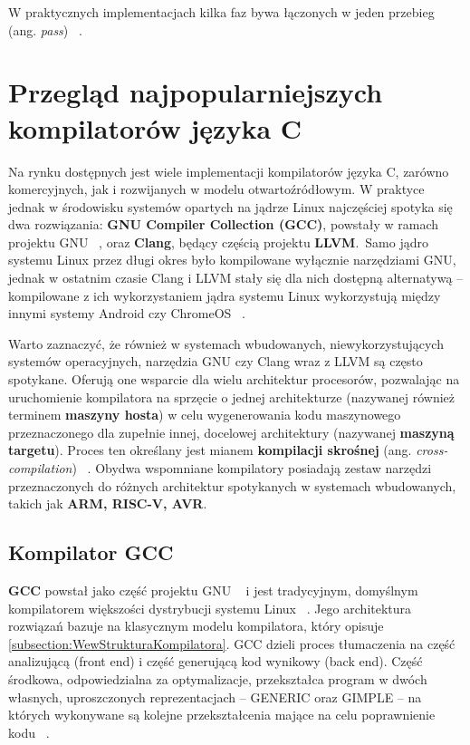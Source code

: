 W praktycznych implementacjach kilka faz bywa łączonych w jeden przebieg (ang. \textit{pass}) ~\cite{Kompilatory_Aho}.


\section{Przegląd najpopularniejszych kompilatorów języka C}

Na rynku dostępnych jest wiele implementacji kompilatorów języka C, zarówno komercyjnych, jak i rozwijanych w modelu otwartoźródłowym. W praktyce jednak w środowisku systemów opartych na jądrze Linux najczęściej spotyka się dwa rozwiązania: \textbf{GNU Compiler Collection (GCC)}, powstały w ramach projektu GNU ~\cite{StallmanGNU}, oraz \textbf{Clang}, będący częścią projektu \textbf{LLVM}.\
Samo jądro systemu Linux przez długi okres było kompilowane wyłącznie narzędziami GNU, jednak w ostatnim czasie Clang i LLVM stały się dla nich dostępną alternatywą -- kompilowane z ich wykorzystaniem jądra systemu Linux wykorzystują między innymi systemy Android czy ChromeOS ~\cite{KernelLLVM}.

Warto zaznaczyć, że również w systemach wbudowanych, niewykorzystujących systemów operacyjnych, narzędzia GNU czy Clang wraz z LLVM są często spotykane. Oferują one wsparcie dla wielu architektur procesorów, pozwalając na uruchomienie kompilatora na sprzęcie o jednej architekturze (nazywanej również terminem \textbf{maszyny hosta}) w celu wygenerowania kodu maszynowego przeznaczonego dla zupełnie innej, docelowej architektury (nazywanej \textbf{maszyną targetu}). Proces ten określany jest mianem \textbf{kompilacji skrośnej} (ang. \textit{cross-compilation}) ~\cite{Kompilatory_Aho}. Obydwa wspomniane kompilatory posiadają zestaw narzędzi przeznaczonych do różnych architektur spotykanych w systemach wbudowanych, takich jak \textbf{ARM, RISC-V, AVR}.
\subsection{Kompilator GCC}

\textbf{GCC} powstał jako część projektu GNU ~\cite{StallmanGNU} i jest tradycyjnym, domyślnym kompilatorem większości dystrybucji systemu Linux ~\cite{LinuxKernelDevelopment}. Jego architektura rozwiązań bazuje na klasycznym modelu kompilatora, który opisuje \cref{subsection:WewStrukturaKompilatora}. GCC dzieli proces tłumaczenia na część analizującą (front end) i część generującą kod wynikowy (back end). Część środkowa, odpowiedzialna za optymalizacje, przekształca program w dwóch własnych, uproszczonych reprezentacjach -- GENERIC oraz GIMPLE -- na których wykonywane są kolejne przekształcenia mające na celu poprawnienie kodu ~\cite{novillo2006gcc}. 
